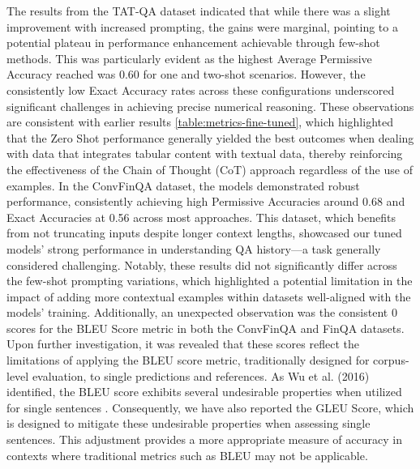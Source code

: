 \documentclass[logo,msc]{infthesis}           %
\begin{document}
The results from the TAT-QA dataset indicated that while there was a slight improvement with increased prompting, the gains were marginal, pointing to a potential plateau in performance enhancement achievable through few-shot methods. This was particularly evident as the highest Average Permissive Accuracy reached was 0.60 for one and two-shot scenarios. However, the consistently low Exact Accuracy rates across these configurations underscored significant challenges in achieving precise numerical reasoning. These observations are consistent with earlier results \ref{table:metrics-fine-tuned}, which highlighted that the Zero Shot performance generally yielded the best outcomes when dealing with data that integrates tabular content with textual data, thereby reinforcing the effectiveness of the Chain of Thought (CoT) approach regardless of the use of examples.
In the ConvFinQA dataset, the models demonstrated robust performance, consistently achieving high Permissive Accuracies around 0.68 and Exact Accuracies at 0.56 across most approaches. This dataset, which benefits from not truncating inputs despite longer context lengths, showcased our tuned models' strong performance in understanding QA history—a task generally considered challenging. Notably, these results did not significantly differ across the few-shot prompting variations, which highlighted a potential limitation in the impact of adding more contextual examples within datasets well-aligned with the models' training. Additionally, an unexpected observation was the consistent 0 scores for the BLEU Score metric in both the ConvFinQA and FinQA datasets. Upon further investigation, it was revealed that these scores reflect the limitations of applying the BLEU score metric, traditionally designed for corpus-level evaluation, to single predictions and references. As Wu et al. (2016) identified, the BLEU score exhibits several undesirable properties when utilized for single sentences \cite{wu2016googles}. Consequently, we have also reported the GLEU Score, which is designed to mitigate these undesirable properties when assessing single sentences. This adjustment provides a more appropriate measure of accuracy in contexts where traditional metrics such as BLEU may not be applicable.
\end{document}
